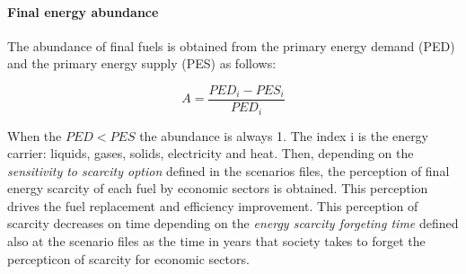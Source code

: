 
\paragraph{Final energy abundance}

The abundance of final fuels is obtained from the primary energy demand (PED) and the primary energy supply (PES) as follows:

\begin{equation}
A= \frac{PED_i-PES_i}{PED_i}
\label{eq:abundance-final-fuels}
\end{equation}

When the $PED<PES$ the abundance is always 1. The index i is the energy carrier: liquids, gases, solids, electricity and heat.
Then, depending on the \emph{sensitivity to scarcity option} defined in the scenarios files, the perception of final energy scarcity of each fuel by economic sectors is obtained. This perception drives the fuel replacement and efficiency improvement. This perception of scarcity decreases on time depending on the \emph{energy scarcity forgeting time} defined also at the scenario files as the time in years that society takes to forget the percepticon of scarcity for economic sectors.